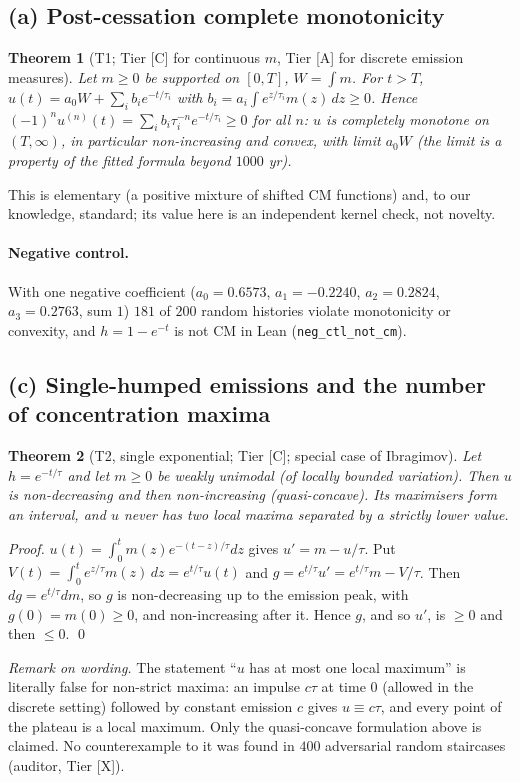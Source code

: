 \documentclass[10pt]{article}
\newcommand{\tier}[1]{\textsf{[#1]}}
\newcommand{\tA}{\tier{A}}
\newcommand{\tC}{\tier{C}}
\newcommand{\tX}{\tier{X}}
\newcommand{\lean}[1]{\texttt{#1}}
\theoremstyle{plain}
\newtheorem{thm}{Theorem}
\begin{document}
\subsection{(a) Post-cessation complete monotonicity}
\begin{thm}[T1; Tier \tC{} for continuous $m$, Tier \tA{} for discrete emission measures]\label{thm:t1}
Let $m\ge0$ be supported on $[0,T]$, $W=\int m$. For $t>T$,
$u(t)=a_0W+\sum_ib_ie^{-t/\tau_i}$ with $b_i=a_i\int e^{z/\tau_i}m(z)\,dz\ge0$. Hence $(-1)^nu^{(n)}(t)=\sum_ib_i\tau_i^{-n}e^{-t/\tau_i}\ge0$ for all $n$: $u$ is completely monotone on $(T,\infty)$, in particular non-increasing and convex, with limit $a_0W$ (the limit is a property of the fitted formula beyond $1000$ yr).
\end{thm}
This is elementary (a positive mixture of shifted CM functions) and, to our knowledge, standard; its value here is an independent kernel check, not novelty.
\paragraph{Negative control.} With one negative coefficient ($a_0=0.6573$, $a_1=-0.2240$, $a_2=0.2824$, $a_3=0.2763$, sum $1$) $181$ of $200$ random histories violate monotonicity or convexity, and $h=1-e^{-t}$ is not CM in Lean (\lean{neg\_ctl\_not\_cm}).

\subsection{(c) Single-humped emissions and the number of concentration maxima}
\begin{thm}[T2, single exponential; Tier \tC{}; special case of Ibragimov]\label{thm:t2}
Let $h=e^{-t/\tau}$ and let $m\ge0$ be weakly unimodal (of locally bounded variation). Then $u$ is non-decreasing and then non-increasing (quasi-concave). Its maximisers form an interval, and $u$ never has two local maxima separated by a strictly lower value.
\end{thm}
\emph{Proof.} $u(t)=\int_0^tm(z)e^{-(t-z)/\tau}dz$ gives $u'=m-u/\tau$. Put $V(t)=\int_0^te^{z/\tau}m(z)\,dz=e^{t/\tau}u(t)$ and $g=e^{t/\tau}u'=e^{t/\tau}m-V/\tau$. Then $dg=e^{t/\tau}dm$, so $g$ is non-decreasing up to the emission peak, with $g(0)=m(0)\ge0$, and non-increasing after it. Hence $g$, and so $u'$, is $\ge0$ and then $\le0$. \qed

\emph{Remark on wording.} The statement ``$u$ has at most one local maximum'' is literally false for non-strict maxima: an impulse $c\tau$ at time $0$ (allowed in the discrete setting) followed by constant emission $c$ gives $u\equiv c\tau$, and every point of the plateau is a local maximum. Only the quasi-concave formulation above is claimed. No counterexample to it was found in $400$ adversarial random staircases (auditor, Tier \tX{}).
\end{document}
